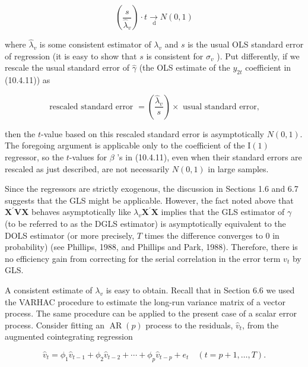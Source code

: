 \documentclass[10pt]{article}
\begin{document}
\begin{equation*}
\left(\frac{s}{\hat{\lambda}_{v}}\right) \cdot t \underset{\mathrm{~d}}{\rightarrow} N(0,1) \tag{10.4.14}
\end{equation*}


where $\hat{\lambda}_{v}$ is some consistent estimator of $\lambda_{v}$ and $s$ is the usual OLS standard error of regression (it is easy to show that $s$ is consistent for $\sigma_{v}$ ). Put differently, if we rescale the usual standard error of $\hat{\gamma}$ (the OLS estimate of the $y_{2 t}$ coefficient in (10.4.11)) as


\begin{equation*}
\text { rescaled standard error }=\left(\frac{\hat{\lambda}_{v}}{s}\right) \times \text { usual standard error, } \tag{10.4.15}
\end{equation*}


then the $t$-value based on this rescaled standard error is asymptotically $N(0,1)$.\\
The foregoing argument is applicable only to the coefficient of the $\mathrm{I}(1)$ regressor, so the $t$-values for $\beta$ 's in (10.4.11), even when their standard errors are rescaled as just described, are not necessarily $N(0,1)$ in large samples.

Since the regressors are strictly exogenous, the discussion in Sections 1.6 and 6.7 suggests that the GLS might be applicable. However, the fact noted above that $\mathbf{X}^{\prime} \mathbf{V X}$ behaves asymptotically like $\lambda_{v} \mathbf{X}^{\prime} \mathbf{X}$ implies that the GLS estimator of $\gamma$ (to be referred to as the DGLS estimator) is asymptotically equivalent to the DOLS estimator (or more precisely, $T$ times the difference converges to 0 in probability) (see Phillips, 1988, and Phillips and Park, 1988). Therefore, there is no efficiency gain from correcting for the serial correlation in the error term $v_{t}$ by GLS.

A consistent estimate of $\lambda_{v}$ is easy to obtain. Recall that in Section 6.6 we used the VARHAC procedure to estimate the long-run variance matrix of a vector process. The same procedure can be applied to the present case of a scalar error process. Consider fitting an $\operatorname{AR}(p)$ process to the residuals, $\hat{v}_{t}$, from the augmented cointegrating regression


\begin{equation*}
\hat{v}_{t}=\phi_{1} \hat{v}_{t-1}+\phi_{2} \hat{v}_{t-2}+\cdots+\phi_{p} \hat{v}_{t-p}+e_{t} \quad(t=p+1, \ldots, T) . \tag{10.4.16}
\end{equation*}
\end{document}
